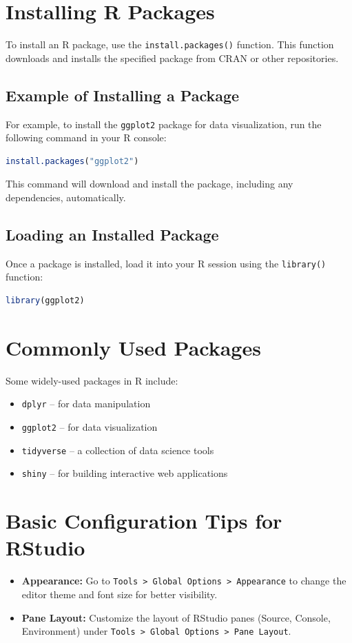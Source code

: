 \documentclass[10pt]{book}
\begin{document}
\section{Installing R Packages}
To install an R package, use the \texttt{install.packages()} function. This function downloads and installs the specified package from CRAN or other repositories.

\subsection{Example of Installing a Package}
For example, to install the \texttt{ggplot2} package for data visualization, run the following command in your R console:
\begin{lstlisting}[language=R]
install.packages("ggplot2")
\end{lstlisting}
This command will download and install the package, including any dependencies, automatically.

\subsection{Loading an Installed Package}
Once a package is installed, load it into your R session using the \texttt{library()} function:
\begin{lstlisting}[language=R]
library(ggplot2)
\end{lstlisting}

\section{Commonly Used Packages}
Some widely-used packages in R include:
\begin{itemize}
    \item \texttt{dplyr} – for data manipulation
    \item \texttt{ggplot2} – for data visualization
    \item \texttt{tidyverse} – a collection of data science tools
    \item \texttt{shiny} – for building interactive web applications
\end{itemize}




\section{Basic Configuration Tips for RStudio}
\begin{itemize}
    \item \textbf{Appearance:} Go to \texttt{Tools > Global Options > Appearance} to change the editor theme and font size for better visibility.
    \item \textbf{Pane Layout:} Customize the layout of RStudio panes (Source, Console, Environment) under \texttt{Tools > Global Options > Pane Layout}.
\end{itemize}
\end{document}
